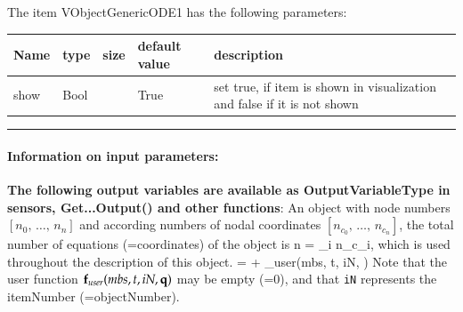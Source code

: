 The item VObjectGenericODE1 has the following parameters:\vspace{-1cm}\\ 
\begin{center}
  \footnotesize
  \begin{longtable}{| p{4.5cm} | p{2.5cm} | p{0.5cm} | p{2.5cm} | p{6cm} |}
    \hline
    \bf Name & \bf type & \bf size & \bf default value & \bf description \\ \hline
    show &     Bool &      &     True &     set true, if item is shown in visualization and false if it is not shown\\ \hline
	  \end{longtable}
	\end{center}
\par\noindent\rule{\textwidth}{0.4pt}
\label{description_ObjectGenericODE1}
\paragraph{Information on input parameters:} 
\finishTable
{\bf The following output variables are available as OutputVariableType in sensors, Get...Output() and other functions}: 
\finishTable
 \noindent
    An object with node numbers $[n_0,\,\ldots,\,n_n]$ and according numbers of nodal coordinates $[n_{c_0},\,\ldots,\,n_{c_n}]$, the total number of equations (=coordinates) of the object is
    \be
      n = \sum_{i} n_{c_i},
    \ee
    which is used throughout the description of this object.
    \be \label{eq_ObjectGenericODE1_EOM}
      \dot \qv = \fv + \fv_{user}(mbs, t, iN, \qv)
    \ee
    Note that the user function $\mathbf{f}_{user}(mbs, t, iN, \mathbf{q})$ may be empty (=0), and that \texttt{iN} represents the itemNumber (=objectNumber). 

